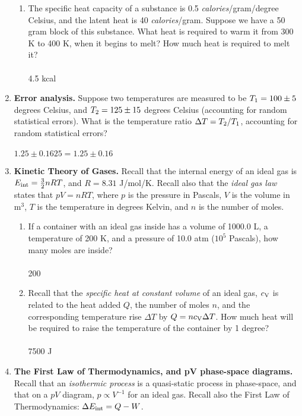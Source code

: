\documentclass[10pt]{article}
\begin{document}
\begin{enumerate}
\begin{enumerate}
\item The specific heat capacity of a substance is 0.5 \textit{calories}/gram/degree Celsius, and the latent heat is 40 \textit{calories}/gram.  Suppose we have a 50 gram block of this substance.  What heat is required to warm it from 300 K to 400 K, when it begins to melt?  How much heat is required to melt it? \\ \\ 4.5 kcal \\
\end{enumerate}
\item \textbf{Error analysis.}  Suppose two temperatures are measured to be $T_{\rm 1} = 100 \pm 5$ degrees Celsius, and $T_{\rm 2} = 125 \pm 15$ degrees Celsius (accounting for random statistical errors).  What is the temperature ratio $\Delta T = T_{\rm 2}/T_{\rm 1}$, accounting for random statistical errors? \\ \\ $1.25 \pm 0.1625 = 1.25 \pm 0.16$
\item \textbf{Kinetic Theory of Gases.} Recall that the internal energy of an ideal gas is $E_{\rm int} = \frac{3}{2}n R T$, and $R = 8.31$ J/mol/K.  Recall also that the \textit{ideal gas law} states that $pV = n R T$, where $p$ is the pressure in Pascals, $V$ is the volume in m$^3$, $T$ is the temperature in degrees Kelvin, and $n$ is the number of moles.
\begin{enumerate}
\item If a container with an ideal gas inside has a volume of 1000.0 L, a temperature of 200 K, and a pressure of 10.0 atm ($10^5$ Pascals), how many moles are inside? \\ \\ 200 \\
\item Recall that the \textit{specific heat at constant volume} of an ideal gas, $c_{\rm V}$ is related to the heat added $Q$, the number of moles $n$, and the corresponding temperature rise $\Delta T$ by $Q = n c_{\rm V} \Delta T$.  How much heat will be required to raise the temperature of the container by 1 degree? \\ \\ 7500 J \\
\end{enumerate}
\item \textbf{The First Law of Thermodynamics, and pV phase-space diagrams.}  Recall that an \textit{isothermic process} is a quasi-static process in phase-space, and that on a $pV$ diagram, $p \propto V^{-1}$ for an ideal gas.  Recall also the First Law of Thermodynamics: $\Delta E_{\rm int} = Q - W$.

\end{enumerate}
\end{document}

